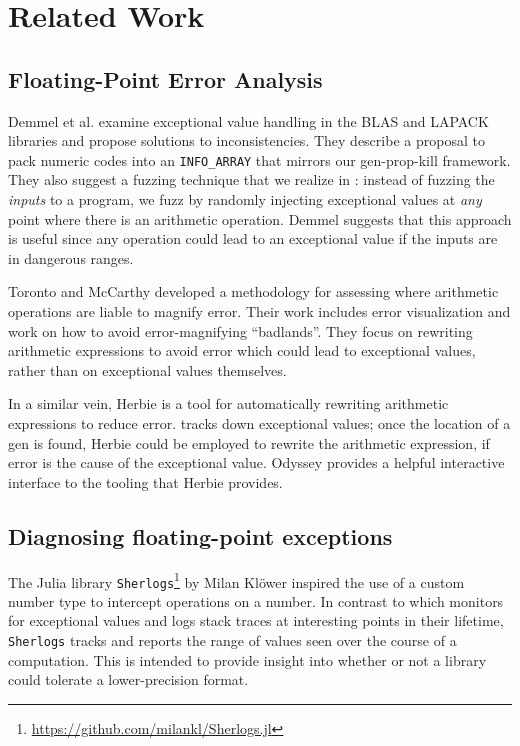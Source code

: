 \documentclass{juliacon}
\begin{document}
\section{Related Work}
\label{s:related}

\subsection{Floating-Point Error Analysis}

Demmel et al.\cite{ddghlllprr-correctness-2022} examine \fp{} exceptional value handling in the BLAS and LAPACK libraries and propose solutions to inconsistencies.
They describe a proposal to pack numeric codes into an \texttt{INFO\_ARRAY} that mirrors our gen-prop-kill framework.
They also suggest a fuzzing technique that we realize in \FT{}:
instead of fuzzing the \emph{inputs} to a program, we fuzz by randomly injecting exceptional values at \emph{any} point where there is an arithmetic operation. Demmel suggests that this approach is useful since any \fp{} operation could lead to an exceptional value if the inputs are in dangerous ranges.

Toronto and McCarthy\cite{torontoPracticallyAccurateFloatingPoint2014} developed a methodology for assessing where arithmetic operations are liable to magnify \fp{} error.
Their work includes error visualization and work on how to avoid error-magnifying ``badlands''.
They focus on rewriting arithmetic expressions to avoid error which could lead to exceptional values, rather than on exceptional values themselves.

In a similar vein, Herbie\cite{panchekhaAutomaticallyImprovingAccuracy2015} is a tool for automatically rewriting arithmetic expressions to reduce \fp{} error.
\FT{} tracks down exceptional \fp{} values; once the location of a gen is found, Herbie could be employed to rewrite the arithmetic expression, if \fp{} error is the cause of the exceptional value.
Odyssey\cite{misbackOdysseyInteractiveWorkbench2023} provides a helpful interactive interface to the tooling that Herbie provides.

\subsection{Diagnosing floating-point exceptions}

The Julia library \texttt{Sherlogs}\footnote{\url{https://github.com/milankl/Sherlogs.jl}} by Milan Klöwer inspired the use of a custom number type to intercept operations on a number.
In contrast to \FT{} which monitors for exceptional values and logs stack traces at interesting points in their lifetime, \texttt{Sherlogs} tracks and reports the range of values seen over the course of a computation.
This is intended to provide insight into whether or not a library could tolerate a lower-precision \fp{} format.
\end{document}
